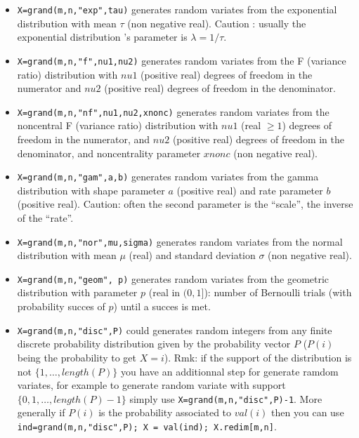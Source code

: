 \begin{description}
\begin{itemize}
\item {} \verb!X=grand(m,n,"exp",tau)! generates random variates from the exponential
  distribution with mean $\tau$ (non negative real). Caution : usually
  the exponential distribution 's parameter is $\lambda= 1/\tau$.  
  
\item {} 
  \verb!X=grand(m,n,"f",nu1,nu2)! generates random variates from the F 
  (variance ratio) distribution with $nu1$ (positive real)
  degrees of freedom in the numerator and $nu2$ (positive real) 
  degrees of freedom in the denominator. 
  
\item {} 
  \verb!X=grand(m,n,"nf",nu1,nu2,xnonc)! generates random variates from the noncentral 
  F (variance ratio)  distribution with $nu1$ (real $\ge 1$) degrees of freedom 
  in the numerator, and $nu2$ (positive real) degrees of freedom in the denominator, 
  and noncentrality parameter $xnonc$ (non negative real). 
  
\item {} \verb!X=grand(m,n,"gam",a,b)! generates random variates from the gamma 
  distribution with shape parameter $a$ (positive real) and rate
  parameter $b$ (positive real). Caution: often the second parameter
  is the ``scale'', the inverse of the ``rate''.  
  
\item {} 
  \verb!X=grand(m,n,"nor",mu,sigma)! generates random variates from the normal 
  distribution with mean $\mu$ (real)  and standard deviation $\sigma$
  (non negative real). 
  
\item {} \verb!X=grand(m,n,"geom", p)! generates random variates from the geometric
  distribution with parameter $p$ (real in $(0,1]$): number of Bernoulli trials (with 
  probability succes of $p$) until a succes is met.

\item {} 
  \verb!X=grand(m,n,"disc",P)! could generates random integers from any
  finite discrete probability distribution given by the probability
  vector $P$ ($P(i)$ being the probability to get $X=i$). Rmk: if the 
  support of the distribution is not $\{1,\dots,length(P)\}$ you have
  an additionnal step for generate ramdom variates, for example to
  generate random variate with support  $\{0,1,\dots,length(P)-1\}$
  simply use \verb!X=grand(m,n,"disc",P)-1!. More generally if $P(i)$ is
  the probability associated to $val(i)$ then you can use 
  \verb!ind=grand(m,n,"disc",P); X = val(ind); X.redim[m,n]!. 
  

\end{itemize}
\end{description}
